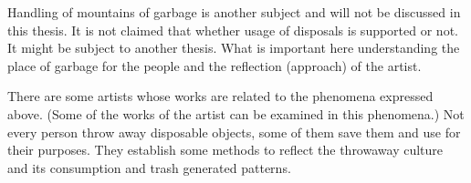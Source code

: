 Handling of mountains of garbage is another subject and will not be discussed in this thesis. It is not claimed that whether usage of disposals is supported or not. It might be subject to another thesis. What is important here understanding the place of garbage for the people and the reflection (approach) of the artist. 







%
%
There are some artists whose works are related to the phenomena expressed above. (Some of the works of the artist can be examined in this phenomena.) Not every person throw away disposable objects, some of them save them and use for their purposes. They establish some methods to reflect the throwaway culture and its consumption and trash generated patterns. 

